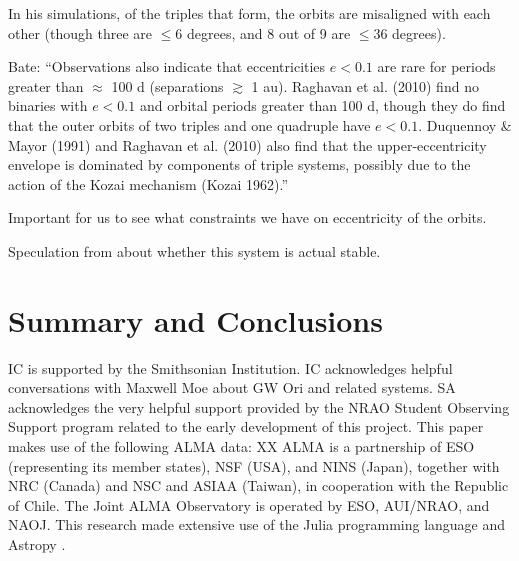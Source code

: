 \documentclass{aastex6}
\begin{document}
In his simulations, of the triples that form, the orbits are misaligned with each other (though three are $\leq 6$ degrees, and 8 out of 9 are $\leq 36$ degrees).

Bate:  ``Observations also indicate that eccentricities $e < 0.1$ are rare for periods greater than $\approx$ 100 d (separations $\gtrsim$ 1 au). Raghavan et al. (2010) find no binaries with $e < 0.1$ and orbital periods greater than 100 d, though they do find that the outer orbits of two triples and one quadruple have $e < 0.1$. Duquennoy \& Mayor (1991) and Raghavan et al. (2010) also find that the upper-eccentricity envelope is dominated by components of triple systems, possibly due to the action of the Kozai mechanism (Kozai 1962).''

Important for us to see what constraints we have on eccentricity of the orbits.

Speculation from \citet{berger11} about whether this system is actual stable.

\section{Summary and Conclusions} \label{sec:summary}

\acknowledgments
IC is supported by the Smithsonian Institution. IC acknowledges helpful conversations with Maxwell Moe about GW Ori and related systems.  SA acknowledges the very helpful support provided by the NRAO Student Observing Support program related to the early development of this project.  This paper makes use of the following ALMA data: XX  ALMA is a partnership of ESO (representing its member states), NSF (USA), and NINS (Japan), together with NRC (Canada) and NSC and ASIAA (Taiwan), in cooperation with the Republic of Chile.  The Joint ALMA Observatory is operated by ESO, AUI/NRAO, and NAOJ.  This research made extensive use of the Julia programming language \citep{julia12} and Astropy \citep{astropy13}.



\end{document}
